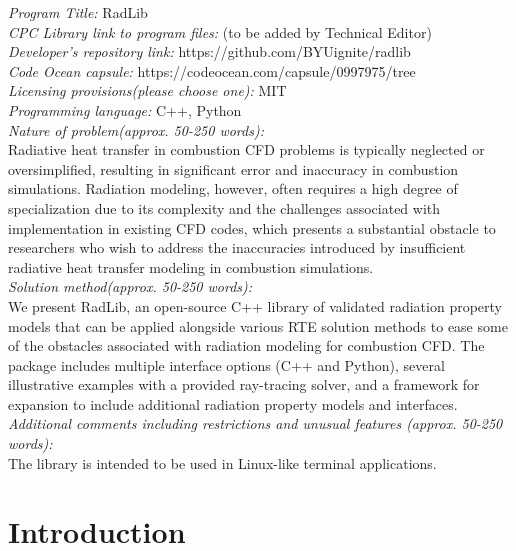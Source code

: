 \documentclass[preprint,12pt]{elsarticle}
\begin{document}
\begin{small}
\noindent
{\em Program Title:} RadLib                                         \\
{\em CPC Library link to program files:} (to be added by Technical Editor) \\
{\em Developer's repository link:} https://github.com/BYUignite/radlib \\
{\em Code Ocean capsule:} https://codeocean.com/capsule/0997975/tree \\
{\em Licensing provisions(please choose one):} MIT \\
{\em Programming language:} C++, Python                                   \\
{\em Nature of problem(approx. 50-250 words):} \\
Radiative heat transfer in combustion CFD problems is typically neglected or oversimplified, resulting in significant error and inaccuracy in combustion simulations. Radiation modeling, however, often requires a high degree of specialization due to its complexity and the challenges associated with implementation in existing CFD codes, which presents a substantial obstacle to researchers who wish to address the inaccuracies introduced by insufficient radiative heat transfer modeling in combustion simulations. \\
{\em Solution method(approx. 50-250 words):}\\
We present RadLib, an open-source C++ library of validated radiation property models that can be applied alongside various RTE solution methods to ease some of the obstacles associated with radiation modeling for combustion CFD. The package includes multiple interface options (C++ and Python), several illustrative examples with a provided ray-tracing solver, and a framework for expansion to include additional radiation property models and interfaces.\\ 
{\em Additional comments including restrictions and unusual features (approx. 50-250 words):}\\
The library is intended to be used in Linux-like terminal applications.  
   \\

\end{small}


\section{Introduction} \label{s:intro}
\end{document}
